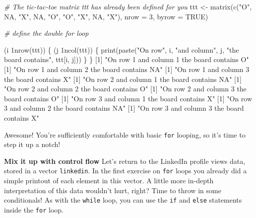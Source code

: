 \documentclass[]{article}
\newcommand{\hlnum}[1]{\textcolor[rgb]{0.816,0.125,0.439}{#1}}%
\newcommand{\hlstr}[1]{\textcolor[rgb]{0.251,0.627,0.251}{#1}}%
\newcommand{\hlcom}[1]{\textcolor[rgb]{0.502,0.502,0.502}{\textit{#1}}}%
\newcommand{\hlstd}[1]{\textcolor[rgb]{0.251,0.251,0.251}{#1}}%
\newcommand{\hlkwc}[1]{\textcolor[rgb]{0.251,0.251,0.251}{#1}}%
\newcommand{\hlkwd}[1]{\textcolor[rgb]{0.878,0.439,0.125}{#1}}%
\newenvironment{Shaded}{\begin{myshaded}}{\end{myshaded}}
\newcommand{\KeywordTok}[1]{\hlkwd{#1}}
\newcommand{\DataTypeTok}[1]{\hlkwc{#1}}
\newcommand{\DecValTok}[1]{\hlnum{#1}}
\newcommand{\StringTok}[1]{\hlstr{#1}}
\newcommand{\CommentTok}[1]{\hlcom{#1}}
\newcommand{\OtherTok}[1]{{#1}}
\newcommand{\NormalTok}[1]{\hlstd{#1}}
\begin{document}
\begin{Shaded}
\begin{Highlighting}[]
\CommentTok{# The tic-tac-toe matrix ttt has already been defined for you}
\NormalTok{ttt <-}\StringTok{ }\KeywordTok{matrix}\NormalTok{(}\KeywordTok{c}\NormalTok{(}\StringTok{"O"}\NormalTok{, }\OtherTok{NA}\NormalTok{, }\StringTok{"X"}\NormalTok{, }\OtherTok{NA}\NormalTok{, }\StringTok{"O"}\NormalTok{, }\StringTok{"O"}\NormalTok{, }\StringTok{"X"}\NormalTok{, }\OtherTok{NA}\NormalTok{, }\StringTok{"X"}\NormalTok{), }\DataTypeTok{nrow =} \DecValTok{3}\NormalTok{, }\DataTypeTok{byrow =} \OtherTok{TRUE}\NormalTok{)}

\CommentTok{# define the double for loop}

\NormalTok{ (i } \DecValTok{1}\OperatorTok{:}\KeywordTok{nrow}\NormalTok{(ttt)) \{}
  \NormalTok{ (j } \DecValTok{1}\OperatorTok{:}\KeywordTok{ncol}\NormalTok{(ttt)) \{}
    \KeywordTok{print}\NormalTok{(}\KeywordTok{paste}\NormalTok{(}\StringTok{"On row"}\NormalTok{, i, }\StringTok{"and column"}\NormalTok{, j, }\StringTok{"the board contains"}\NormalTok{, ttt[i, j]))}
\NormalTok{  \}}
\NormalTok{\}}
\NormalTok{   [}\DecValTok{1}\NormalTok{] }\StringTok{"On row 1 and column 1 the board contains O"}
\NormalTok{   [}\DecValTok{1}\NormalTok{] }\StringTok{"On row 1 and column 2 the board contains NA"}
\NormalTok{   [}\DecValTok{1}\NormalTok{] }\StringTok{"On row 1 and column 3 the board contains X"}
\NormalTok{   [}\DecValTok{1}\NormalTok{] }\StringTok{"On row 2 and column 1 the board contains NA"}
\NormalTok{   [}\DecValTok{1}\NormalTok{] }\StringTok{"On row 2 and column 2 the board contains O"}
\NormalTok{   [}\DecValTok{1}\NormalTok{] }\StringTok{"On row 2 and column 3 the board contains O"}
\NormalTok{   [}\DecValTok{1}\NormalTok{] }\StringTok{"On row 3 and column 1 the board contains X"}
\NormalTok{   [}\DecValTok{1}\NormalTok{] }\StringTok{"On row 3 and column 2 the board contains NA"}
\NormalTok{   [}\DecValTok{1}\NormalTok{] }\StringTok{"On row 3 and column 3 the board contains X"}
\end{Highlighting}
\end{Shaded}

Awesome! You're sufficiently comfortable with basic \texttt{for}
looping, so it's time to step it up a notch!

\textbf{Mix it up with control flow} Let's return to the LinkedIn
profile views data, stored in a vector \texttt{linkedin}. In the first
exercise on \texttt{for} loops you already did a simple printout of each
element in this vector. A little more in-depth interpretation of this
data wouldn't hurt, right? Time to throw in some conditionals! As with
the \texttt{while} loop, you can use the \texttt{if} and \texttt{else}
statements inside the \texttt{for} loop.
\end{document}
